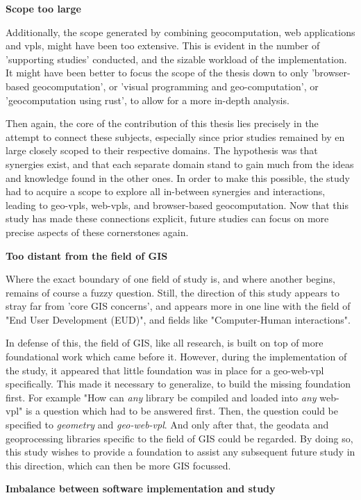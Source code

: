 \textbf{Scope too large}

Additionally, the scope generated by combining geocomputation, web applications and vpls, might have been too extensive. 
This is evident in the number of 'supporting studies' conducted, and the sizable workload of the implementation.
It might have been better to focus the scope of the thesis down to only 'browser-based geocomputation', or 'visual programming and geo-computation', or 'geocomputation using rust', to allow for a more in-depth analysis.

Then again, the core of the contribution of this thesis lies precisely in the attempt to connect these subjects,
especially since prior studies remained by en large closely scoped to their respective domains.
The hypothesis was that synergies exist, and that each separate domain stand to gain much from the ideas and knowledge found in the other ones. 
In order to make this possible, the study had to acquire a scope to explore all in-between synergies and interactions, leading to geo-vpls, web-vpls, and browser-based geocomputation. 
Now that this study has made these connections explicit, future studies can focus on more precise aspects of these cornerstones again.

\textbf{Too distant from the field of GIS}

Where the exact boundary of one field of study is, and where another begins, remains of course a fuzzy question. 
Still, the direction of this study appears to stray far from 'core GIS concerns', and appears more in one line with the  field of "End User Development (EUD)", and fields like "Computer-Human interactions". 

In defense of this, the field of GIS, like all research, is built on top of more foundational work which came before it. 
However, during the implementation of the study, it appeared that little foundation was in place for a geo-web-vpl specifically. 
This made it necessary to generalize, to build the missing foundation first.
For example "How can \emph{any} library be compiled and loaded into \emph{any} web-vpl" is a question which had to be answered first. 
Then, the question could be specified to \emph{geometry} and \emph{geo-web-vpl}. 
And only after that, the geodata and geoprocessing libraries specific to the field of GIS could be regarded. 
By doing so, this study wishes to provide a foundation to assist any subsequent future study in this direction, which can then be more GIS focussed.

\textbf{Imbalance between software implementation and study}


